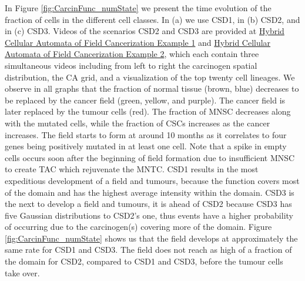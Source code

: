 \documentclass[\main/thesis.tex]{subfiles}
\begin{document}
In Figure \ref{fig:CarcinFunc_numState} we present the time evolution of the fraction of cells in the different cell classes. In (a) we use CSD1, in (b) CSD2, and in (c) CSD3. Videos of the scenarios CSD2 and CSD3 are provided at \href{https://youtu.be/eKxsrSoDiKs}{Hybrid Cellular Automata of Field Cancerization Example 1} and \href{https://youtu.be/Gtf6MoxXCkM}{Hybrid Cellular Automata of Field Cancerization Example 2}, which each contain three simultaneous videos including from left to right the carcinogen spatial distribution, the CA grid, and a visualization of the top twenty cell lineages. We observe in all graphs that the fraction of normal tissue (brown, blue) decreases to be replaced by the cancer field (green, yellow, and purple). The cancer field is later replaced by the tumour cells (red). The fraction of MNSC decreases along with the mutated cells, while the fraction of CSCs increases as the cancer increases. The field starts to form at around 10 months as it correlates to four genes being positively mutated in at least one cell. Note that a spike in empty cells occurs soon after the beginning of field formation due to insufficient MNSC to create TAC which rejuvenate the MNTC. CSD1 results in the most expeditious development of a field and tumours, because the function covers most of the domain and has the highest average intensity within the domain. CSD3 is the next to develop a field and tumours, it is ahead of CSD2 because CSD3 has five Gaussian distributions to CSD2's one, thus events have a higher probability of occurring due to the carcinogen(s) covering more of the domain. Figure \ref{fig:CarcinFunc_numState} shows us that the field develops at approximately the same rate for CSD1 and CSD3. The field does not reach as high of a fraction of the domain for CSD2, compared to CSD1 and CSD3, before the tumour cells take over. 
\end{document}

